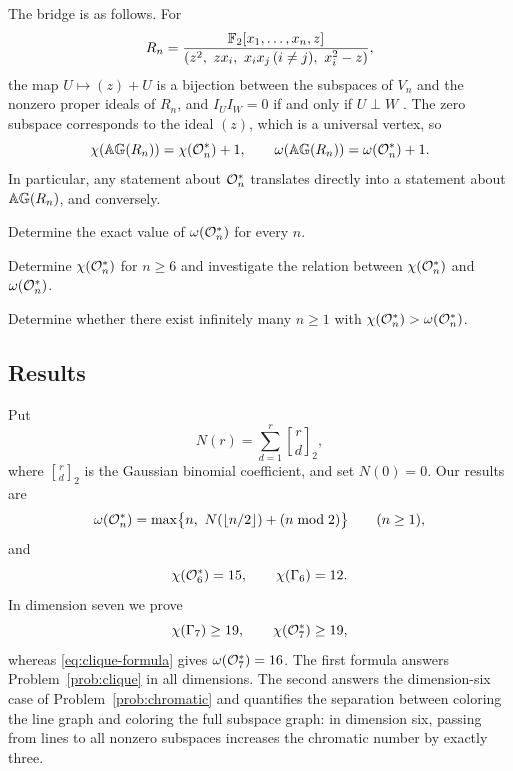 The bridge is as follows.  For
\[
R_n=\frac{\F[x_1,\dots,x_n,z]}{(z^2,\ zx_i,\ x_ix_j\,(i\ne j),\
x_i^2-z)},
\]
the map \(U\mapsto (z)+U\) is a bijection between the subspaces of
\(V_n\) and the nonzero proper ideals of \(R_n\), and
\(I_UI_W=0\) if and only if \(U\perp W\) \cite{Nikandish2026}.  The
zero subspace corresponds to the ideal \((z)\), which is a universal
vertex, so
\[
\chi(\mathbb{AG}(R_n))=\chi(\mathcal O_n^*)+1,\qquad
\omega(\mathbb{AG}(R_n))=\omega(\mathcal O_n^*)+1 .
\]
In particular, any statement about \(\mathcal O_n^*\) translates directly
into a statement about \(\mathbb{AG}(R_n)\), and conversely.

\begin{problem}\label{prob:clique}
Determine the exact value of \(\omega(\mathcal O_n^*)\) for every \(n\).
\end{problem}

\begin{problem}\label{prob:chromatic}
Determine \(\chi(\mathcal O_n^*)\) for \(n\ge6\) and investigate the relation
between \(\chi(\mathcal O_n^*)\) and \(\omega(\mathcal O_n^*)\).
\end{problem}

\begin{problem}\label{prob:infinite}
Determine whether there exist infinitely many \(n\ge1\) with
\(\chi(\mathcal O_n^*)>\omega(\mathcal O_n^*)\).
\end{problem}

\subsection*{Results}

Put
\[
N(r)=\sum_{d=1}^{r}\genfrac{[}{]}{0pt}{}{r}{d}_2,
\]
where \(\genfrac{[}{]}{0pt}{}{r}{d}_2\) is the Gaussian binomial coefficient, and set
\(N(0)=0\).  Our results are
\begin{equation}\label{eq:clique-formula}
\omega(\mathcal O_n^*)=\max\bigl\{n,\ N(\lfloor n/2\rfloor)+(n\bmod 2)\bigr\}
\qquad(n\ge1),
\end{equation}
and
\begin{equation}\label{eq:chromatic-six}
\chi(\mathcal O_6^*)=15,\qquad \chi(\Gamma_6)=12 .
\end{equation}
In dimension seven we prove
\begin{equation}\label{eq:chromatic-seven}
\chi(\Gamma_7)\geq19,\qquad \chi(\mathcal O_7^*)\geq19,
\end{equation}
whereas \eqref{eq:clique-formula} gives $\omega(\mathcal O_7^*)=16$.
The first formula answers Problem~\ref{prob:clique} in all
dimensions.  The second answers the dimension-six case of
Problem~\ref{prob:chromatic} and quantifies the separation between
coloring the line graph and coloring the full subspace graph: in
dimension six, passing from lines to all nonzero subspaces increases
the chromatic number by exactly three.


